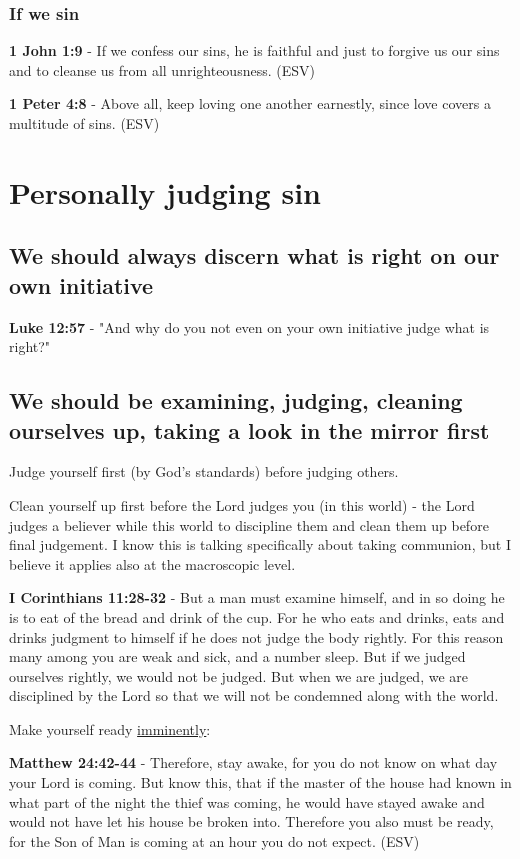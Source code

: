 \documentclass[11pt]{article}
\begin{document}
\subsubsection{If we sin}
\label{sec:org99b20fd}
\textbf{1 John 1:9} -  If we confess our sins, he is faithful and just to forgive us our sins and to cleanse us from all unrighteousness.  (ESV)

\textbf{1 Peter 4:8} -  Above all, keep loving one another earnestly, since love covers a multitude of sins.  (ESV)

\section{Personally judging sin}
\label{sec:org25df53c}
\subsection{We should always discern what is right on our own initiative}
\label{sec:org6e8f524}
\textbf{Luke 12:57} - "And why do you not even on your own initiative judge what is right?"

\subsection{We should be examining, judging, cleaning ourselves up, taking a look in the mirror first}
\label{sec:orgeda6fdc}
Judge yourself first (by God's standards) before judging others.

Clean yourself up first before the Lord judges you (in this world) - the Lord judges a believer while this world to discipline them and clean them up before final judgement.
I know this is talking specifically about taking communion, but I believe it applies also at the macroscopic level.

\textbf{I Corinthians 11:28-32} - But a man must examine himself, and in so doing he is to eat of the bread and drink of the cup.  For he who eats and drinks, eats and drinks judgment to himself if he does not judge the body rightly.  For this reason many among you are weak and sick, and a number sleep.  But if we judged ourselves rightly, we would not be judged.  But when we are judged, we are disciplined by the Lord so that we will not be condemned along with the world.

Make yourself ready \uline{imminently}:

\textbf{Matthew 24:42-44} - Therefore, stay awake, for you do not know on what day your Lord is coming. But know this, that if the master of the house had known in what part of the night the thief was coming, he would have stayed awake and would not have let his house be broken into. Therefore you also must be ready, for the Son of Man is coming at an hour you do not expect. (ESV)
\end{document}
